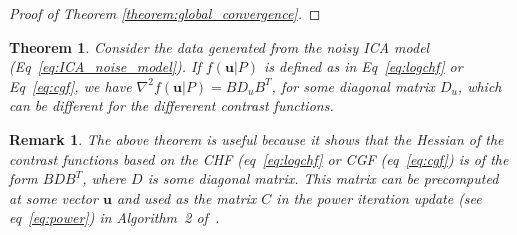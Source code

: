 \documentclass[letterpaper]{article}
\newtheorem{remark}{Remark}
\newtheorem{theorem}{Theorem}
\newcommand{\bas}[1]{\begin{align*}#1\end{align*}}
\newcommand{\bu}{\pmb{u}}
\newcommand{\bx}{\pmb{x}}
\newcommand{\E}{\mathbb{E}}
\newcommand{\cov}{\text{cov}}
\begin{document}
\begin{proof}[Proof of Theorem \ref{theorem:global_convergence}]

\end{proof}


\begin{theorem}
   \label{theorem:CGF_CHF_quasi_orth}
   Consider the data generated from the noisy ICA model (Eq~\ref{eq:ICA_noise_model}). If $f(\bu|P)$ is defined as in Eq~\ref{eq:logchf} or Eq~\ref{eq:cgf}, we have $\nabla^2 f(\bu|P)=BD_uB^T$, for some diagonal matrix $D_{u}$, which can be different for the differerent contrast functions.
\end{theorem}
\begin{remark}
    The above theorem is useful because it shows that the Hessian of the contrast functions based on the CHF (eq~\ref{eq:logchf} or CGF (eq~\ref{eq:cgf}) is of the form $BDB^T$, where $D$ is some diagonal matrix. This matrix can be precomputed at some vector $\bu$ and used as the matrix $C$ in the power iteration update (see eq~\ref{eq:power}) in Algorithm~2 of~\cite{NIPS2015_89f03f7d}. 
\end{remark}
\end{document}
